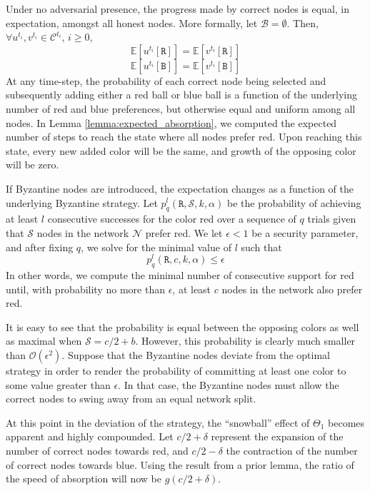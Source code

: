 Under no adversarial presence, the progress made by correct nodes is equal, in expectation, amongst all honest nodes. More formally, let $\mathcal{B} = \emptyset$. Then, $\forall u^{t_i}, v^{t_i} \in \mathcal{C}^{t_i}$, $i \geq 0$, 
\[
    \mathbb{E}[u^{t_i}[\mathtt{R}]] = \mathbb{E}[v^{t_i}[\mathtt{R}]]
\]
\[
    \mathbb{E}[u^{t_i}[\mathtt{B}]] = \mathbb{E}[v^{t_i}[\mathtt{B}]]
\]
At any time-step, the probability of each correct node being selected and subsequently adding either a red ball or blue ball is a function of the underlying number of red and blue preferences, but otherwise equal and uniform among all nodes. In Lemma \ref{lemma:expected_absorption}, we computed the expected number of steps to reach the state where all nodes prefer red. Upon reaching this state, every new added color will be the same, and growth of the opposing color will be zero. 

If Byzantine nodes are introduced, the expectation changes as a function of the underlying Byzantine strategy. Let $p_q^l(\mathtt{R}, \mathcal{S}, k, \alpha)$ be the probability of achieving at least $l$ consecutive successes for the color red over a sequence of $q$ trials given that $\mathcal{S}$ nodes in the network $\mathcal{N}$ prefer red. We let $\epsilon < 1$ be a security parameter, and after fixing $q$, we solve for the minimal value of $l$ such that 
\[
    p_q^l(\mathtt{R}, c, k, \alpha) \leq \epsilon
\]
In other words, we compute the minimal number of consecutive support for red until, with probability no more than $\epsilon$, at least $c$ nodes in the network also prefer red. 

It is easy to see that the probability is equal between the opposing colors as well as maximal when $\mathcal{S} = c/2 + b$. However, this probability is clearly much smaller than $\mathcal{O}(\epsilon^2)$. Suppose that the Byzantine nodes deviate from the optimal strategy in order to render the probability of committing at least one color to some value greater than $\epsilon$. In that case, the Byzantine nodes must allow the correct nodes to swing away from an equal network split. 

At this point in the deviation of the strategy, the ``snowball'' effect of $\Theta_1$ becomes apparent and highly compounded. Let $c/2 + \delta$ represent the expansion of the number of correct nodes towards red, and $c/2 - \delta$ the contraction of the number of correct nodes towards blue. Using the result from a prior lemma, the ratio of the speed of absorption will now be $g(c/2 + \delta)$. 

